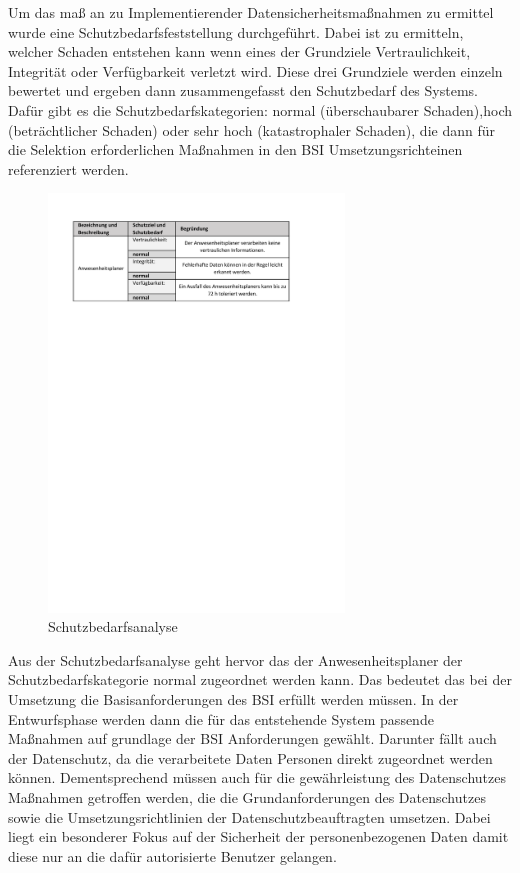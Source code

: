 Um das maß an zu Implementierender Datensicherheitsmaßnahmen zu ermittel wurde eine Schutzbedarfsfeststellung durchgeführt. Dabei ist zu ermitteln, welcher Schaden entstehen kann wenn eines der Grundziele Vertraulichkeit, Integrität oder Verfügbarkeit verletzt wird. Diese drei Grundziele werden einzeln bewertet und ergeben dann zusammengefasst den Schutzbedarf des Systems. Dafür gibt es die Schutzbedarfskategorien: normal (überschaubarer Schaden),hoch (beträchtlicher Schaden) oder sehr hoch (katastrophaler Schaden), die dann für die Selektion erforderlichen Maßnahmen in den BSI Umsetzungsrichteinen referenziert werden.

\begin{figure}[htbp]
    \centering
    \includegraphics[width=0.7\textwidth,angle=0]{abb/Schutzbedarfsanalyse.pdf}
    \caption[Beschreibung]{Schutzbedarfsanalyse}
    \label{abb:Schutzbedarfsanalyse}
\end{figure}

Aus der Schutzbedarfsanalyse geht hervor das der Anwesenheitsplaner der Schutzbedarfskategorie normal zugeordnet werden kann. Das bedeutet das bei der Umsetzung die Basisanforderungen des BSI erfüllt werden müssen. In der Entwurfsphase werden dann die für das entstehende System passende Maßnahmen auf grundlage der BSI Anforderungen gewählt. Darunter fällt auch der Datenschutz, da die verarbeitete Daten Personen direkt zugeordnet werden können. Dementsprechend müssen auch für die gewährleistung des Datenschutzes Maßnahmen getroffen werden, die die Grundanforderungen des Datenschutzes sowie die Umsetzungsrichtlinien der Datenschutzbeauftragten umsetzen. Dabei liegt ein besonderer Fokus auf der Sicherheit der personenbezogenen Daten damit diese nur an die dafür autorisierte Benutzer gelangen.

